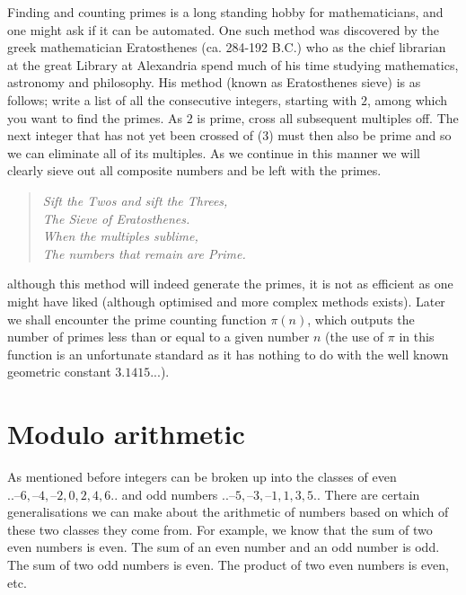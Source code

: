 Finding and counting primes is a long standing hobby for mathematicians, and
one might ask if it can be automated. One such method was discovered by the
greek mathematician Eratosthenes (ca. 284-192 B.C.) who as the chief librarian
at the great Library at Alexandria spend much of his time studying mathematics,
astronomy and philosophy. His method (known as Eratosthenes sieve) is as
follows; write a list of all the consecutive integers, starting with $2$,
among which you want to find the primes. As $2$ is prime, cross all subsequent
multiples off. The next integer that has not yet been crossed of (3) must then
also be prime and so we can eliminate all of its multiples. As we continue in
this manner we will clearly sieve out all composite numbers and be left with
the primes.
\begin{verse}\emph{
Sift the Twos and sift the Threes,\\
The Sieve of Eratosthenes.\\
When the multiples sublime,\\
The numbers that remain are Prime.}
\end{verse}
although this method will indeed generate the primes, it is not as efficient
as one might have liked (although optimised and more complex methods exists).
Later we shall encounter the prime counting function $\pi(n)$, which outputs
the number of primes less than or equal to a given number $n$ (the use of
$\pi$ in this function is an unfortunate standard as it has nothing to do with
the well known geometric constant $3.1415...$).


\section{Modulo arithmetic}
As mentioned before integers can be broken up into the classes of even
$..–6, –4, –2, 0, 2, 4, 6..$ and odd numbers $..–5, –3, –1, 1, 3, 5..$
There are certain generalisations we can make about the arithmetic of
numbers based on which of these two classes they come from. For example,
we know that the sum of two even numbers is even. The sum of an even
number and an odd number is odd. The sum of two odd numbers is even.
The product of two even numbers is even, etc.

